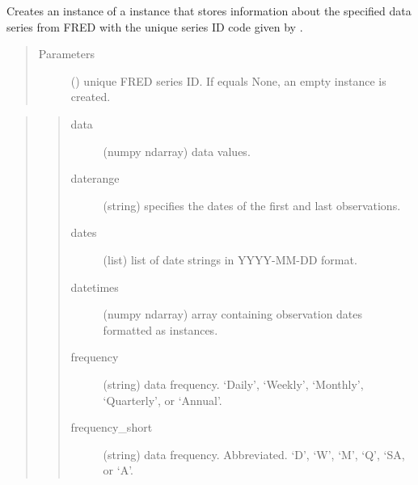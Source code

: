 \documentclass[letterpaper,10pt,openany,oneside,english]{sphinxmanual}
\begin{document}
\begin{fulllineitems}
\label{\detokenize{series_class:fredpy.series}}
Creates an instance of a {\hyperref[\detokenize{series_class:fredpy.series}]{}} instance that stores information about the specified data series from FRED with the unique series ID code given by .
\begin{quote}\begin{description}
\item[{Parameters}] \leavevmode
{} () \textendash{} unique FRED series ID. If  equals None, an empty {\hyperref[\detokenize{series_class:fredpy.series}]{}} instance is created.

\end{description}\end{quote}

\begin{quote}
\begin{quote}\begin{description}
\item[{data}] \leavevmode
(numpy ndarray) \textendash{}  data values.

\item[{daterange}] \leavevmode
(string) \textendash{} specifies the dates of the first and last observations.

\item[{dates}] \leavevmode
(list) \textendash{} list of date strings in YYYY-MM-DD format.

\item[{datetimes}] \leavevmode
(numpy ndarray) \textendash{} array containing observation dates formatted as  instances.

\item[{frequency}] \leavevmode
(string) \textendash{} data frequency. ‘Daily’, ‘Weekly’, ‘Monthly’, ‘Quarterly’, or ‘Annual’.

\item[{frequency\_short}] \leavevmode
(string) \textendash{} data frequency. Abbreviated. ‘D’, ‘W’, ‘M’, ‘Q’, ‘SA, or ‘A’.


\end{description}
\end{quote}
\end{quote}
\end{fulllineitems}
\end{document}
